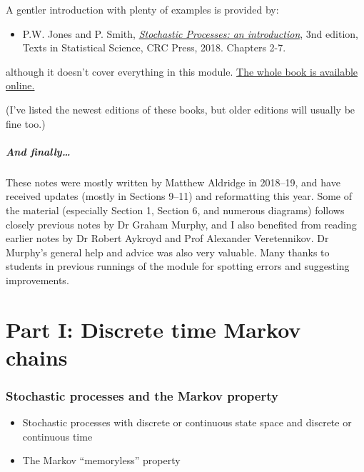 \documentclass[
  a4paper,
]{article}
\providecommand{\tightlist}{%
  \setlength{\itemsep}{0pt}\setlength{\parskip}{0pt}}
\theoremstyle{definition}
\theoremstyle{definition}
\theoremstyle{definition}
\theoremstyle{remark}
\begin{document}
A gentler introduction with plenty of examples is provided by:

\begin{itemize}
\tightlist
\item
  P.W. Jones and P. Smith, \href{https://leeds.primo.exlibrisgroup.com/permalink/44LEE_INST/13rlbcs/alma991002938739705181}{\emph{Stochastic Processes: an introduction}}, 3nd edition, Texts in Statistical Science, CRC Press, 2018. Chapters 2-7.
\end{itemize}

although it doesn't cover everything in this module. \href{https://leeds.primo.exlibrisgroup.com/permalink/44LEE_INST/13rlbcs/alma991002938739705181}{The whole book is available online.}

(I've listed the newest editions of these books, but older editions will usually be fine too.)

\hypertarget{finally}{%
\subsubsection*{And finally\ldots{}}\label{finally}}

These notes were mostly written by Matthew Aldridge in 2018--19, and have received updates (mostly in Sections 9--11) and reformatting this year. Some of the material (especially Section 1, Section 6, and numerous diagrams) follows closely previous notes by Dr Graham Murphy, and I also benefited from reading earlier notes by Dr Robert Aykroyd and Prof Alexander Veretennikov. Dr Murphy's general help and advice was also very valuable. Many thanks to students in previous runnings of the module for spotting errors and suggesting improvements.

\hypertarget{part-part-i-discrete-time-markov-chains}{%
\part*{Part I: Discrete time Markov chains}\label{part-part-i-discrete-time-markov-chains}}

\hypertarget{S01-stochastic-processes}{%
\section{Stochastic processes and the Markov property}\label{S01-stochastic-processes}}

\begin{itemize}
\tightlist
\item
  Stochastic processes with discrete or continuous state space and discrete or continuous time
\item
  The Markov ``memoryless'' property
\end{itemize}
\end{document}
